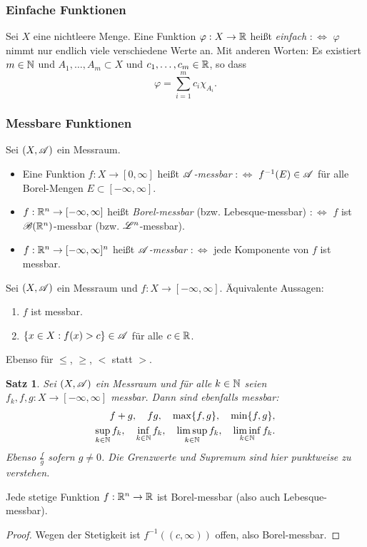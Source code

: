 \documentclass[
 a4paper,
 12pt,
 parskip=half
 ]{scrartcl}
\theoremstyle{plain}
\newtheorem*{thm*}{Satz}
\theoremstyle{definition}
\numberwithin{equation}{section}
\begin{document}
\subsubsection{Einfache Funktionen}
Sei $X$ eine nichtleere Menge. Eine Funktion $\varphi: X \to \mathbb{R}$ heißt \emph{einfach} $:\Leftrightarrow$ $\varphi$ nimmt nur endlich viele verschiedene Werte an. Mit anderen Worten: Es existiert $m \in \mathbb{N}$ und $A_1, \ldots, A_m \subset X$ und $c_1, \ldots, c_m \in \mathbb{R}$, so dass
\[ \varphi = \sum_{i=1}^m c_i \chi_{A_i}. \]

\subsubsection{Messbare Funktionen}
Sei $(X, \mathscr{A})$ ein Messraum.
\begin{itemize}
 \item Eine Funktion $f: X \to [0, \infty]$ heißt \emph{$\mathscr{A}$-messbar} $:\Leftrightarrow$ $f^{-1}(E) \in \mathscr{A}$ für alle Borel-Mengen $E \subset [-\infty,\infty]$.
 \item $f: \mathbb{R}^n \to [-\infty,\infty]$ heißt \emph{Borel-messbar} (bzw. Lebesque-messbar) $:\Leftrightarrow$ $f$ ist $\mathscr{B}(\mathbb{R}^n)$-messbar (bzw. $\mathscr{L}^n$-messbar).
 \item $f: \mathbb{R}^n \to [-\infty,\infty]^n$ heißt \emph{$\mathscr{A}$-messbar} $:\Leftrightarrow$ jede Komponente von $f$ ist messbar.
\end{itemize}

\begin{bem}
 Sei $(X, \mathscr{A})$ ein Messraum und $f: X \to [-\infty,\infty]$. Äquivalente Aussagen:
 \begin{enumerate}
  \item $f$ ist messbar.
  \item $\{ x \in X: f(x) > c \} \in \mathscr{A}$ für alle $c \in \mathbb{R}$.
 \end{enumerate}
 Ebenso für $\le$, $\ge$, $<$ statt $>$.
\end{bem}

\begin{thm*}
 Sei $(X, \mathscr{A})$ ein Messraum und für alle $k \in \mathbb{N}$ seien $f_k, f, g: X \to [-\infty,\infty]$ messbar. Dann sind ebenfalls messbar:
 \begin{align*}
 f+g,\quad fg,\quad \max\{ f, g \},\quad \min\{ f, g \}, \\ \sup_{k \in \mathbb{N}} f_k,\quad \inf_{k \in \mathbb{N}} f_k,\quad \limsup_{k \in \mathbb{N}} f_k,\quad \liminf_{k \in \mathbb{N}} f_k.
 \end{align*}
 Ebenso $\frac{f}{g}$ sofern $g \ne 0$. Die Grenzwerte und Supremum sind hier \emph{punktweise} zu verstehen.
\end{thm*}

\begin{bem}
 Jede stetige Funktion $f:\mathbb{R}^n \to \mathbb{R}$ ist Borel-messbar (also auch Lebesque-messbar).
\end{bem}

\begin{proof}
 Wegen der Stetigkeit ist $f^{-1}((c,\infty))$ offen, also Borel-messbar.
\end{proof}
\end{document}
